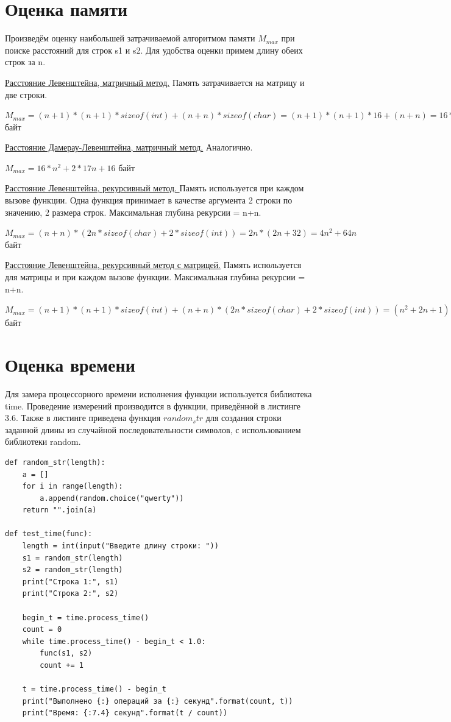 \documentclass[10pt,a4paper]{report}
\begin{document}
	\section{Оценка памяти}
	Произведём оценку наибольшей затрачиваемой алгоритмом памяти $M_{max}$ при поиске расстояний для строк s1 и s2. Для удобства оценки примем длину обеих строк за n.
	
	\underline{Расстояние Левенштейна, матричный метод.} 
	Память затрачивается на матрицу и две строки.
	\par $M_{max} = (n+1)*(n+1)*sizeof(int) + (n+n)*sizeof(char) = 
	(n+1)*(n+1)*16 + (n+n) = 16*n^2 + 2*17n + 16 $ байт
	
	\underline{Расстояние Дамерау-Левенштейна, матричный метод.} 
	Аналогично.
	\par $M_{max} = 16*n^2 + 2*17n + 16 $ байт
	
	\underline{Расстояние Левенштейна, рекурсивный метод. }
	Память используется при каждом вызове функции. Одна функция принимает в качестве аргумента 2 строки по значению, 2 размера строк. Максимальная глубина рекурсии = n+n.
	\par $M_{max} = (n+n)*(2n*sizeof(char) + 2*sizeof(int)) = 2n*(2n + 32) = 4n^2 + 64n $ байт
	
	\underline{Расстояние Левенштейна, рекурсивный метод с матрицей.}
	Память используется для матрицы и при каждом вызове функции. Максимальная глубина рекурсии = n+n.
	\par $M_{max} = (n+1)*(n+1)*sizeof(int) + (n+n)*(2n*sizeof(char) + 2*sizeof(int)) = (n^2+2n+1)*16 + 2n*(2n + 32) = 20n^2 + 96n  + 16 $ байт
	
	\section{Оценка времени}
	Для замера процессорного времени исполнения функции используется библиотека time. Проведение измерений производится в функции, приведённой в листинге 3.6. Также в листинге приведена функция $random_str$ для создания строки заданной длины из случайной последовательности символов, с использованием библиотеки random.
	
	\begin{lstlisting}[caption = Функция замера процессорного времени работы функции]
def random_str(length):
	a = []
	for i in range(length):
		a.append(random.choice("qwerty"))
	return "".join(a)

def test_time(func):
	length = int(input("Введите длину строки: "))
	s1 = random_str(length)
	s2 = random_str(length)
	print("Строка 1:", s1)
	print("Строка 2:", s2)
	
	begin_t = time.process_time()
	count = 0
	while time.process_time() - begin_t < 1.0:
		func(s1, s2)
		count += 1
	
	t = time.process_time() - begin_t
	print("Выполнено {:} операций за {:} секунд".format(count, t))
	print("Время: {:7.4} секунд".format(t / count))
	\end{lstlisting}
\end{document}

